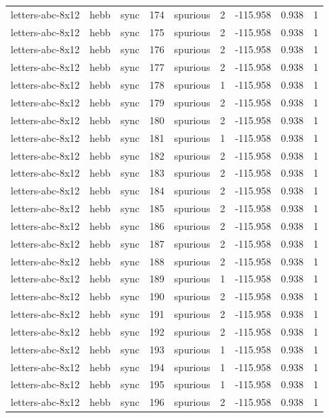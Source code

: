 \begin{tabular}{lllrlrrrr}
letters-abc-8x12 & hebb & sync & 174 & spurious & 2 & -115.958 & 0.938 & 1 \\
letters-abc-8x12 & hebb & sync & 175 & spurious & 2 & -115.958 & 0.938 & 1 \\
letters-abc-8x12 & hebb & sync & 176 & spurious & 2 & -115.958 & 0.938 & 1 \\
letters-abc-8x12 & hebb & sync & 177 & spurious & 2 & -115.958 & 0.938 & 1 \\
letters-abc-8x12 & hebb & sync & 178 & spurious & 1 & -115.958 & 0.938 & 1 \\
letters-abc-8x12 & hebb & sync & 179 & spurious & 2 & -115.958 & 0.938 & 1 \\
letters-abc-8x12 & hebb & sync & 180 & spurious & 2 & -115.958 & 0.938 & 1 \\
letters-abc-8x12 & hebb & sync & 181 & spurious & 1 & -115.958 & 0.938 & 1 \\
letters-abc-8x12 & hebb & sync & 182 & spurious & 2 & -115.958 & 0.938 & 1 \\
letters-abc-8x12 & hebb & sync & 183 & spurious & 2 & -115.958 & 0.938 & 1 \\
letters-abc-8x12 & hebb & sync & 184 & spurious & 2 & -115.958 & 0.938 & 1 \\
letters-abc-8x12 & hebb & sync & 185 & spurious & 2 & -115.958 & 0.938 & 1 \\
letters-abc-8x12 & hebb & sync & 186 & spurious & 2 & -115.958 & 0.938 & 1 \\
letters-abc-8x12 & hebb & sync & 187 & spurious & 2 & -115.958 & 0.938 & 1 \\
letters-abc-8x12 & hebb & sync & 188 & spurious & 2 & -115.958 & 0.938 & 1 \\
letters-abc-8x12 & hebb & sync & 189 & spurious & 1 & -115.958 & 0.938 & 1 \\
letters-abc-8x12 & hebb & sync & 190 & spurious & 2 & -115.958 & 0.938 & 1 \\
letters-abc-8x12 & hebb & sync & 191 & spurious & 2 & -115.958 & 0.938 & 1 \\
letters-abc-8x12 & hebb & sync & 192 & spurious & 2 & -115.958 & 0.938 & 1 \\
letters-abc-8x12 & hebb & sync & 193 & spurious & 1 & -115.958 & 0.938 & 1 \\
letters-abc-8x12 & hebb & sync & 194 & spurious & 1 & -115.958 & 0.938 & 1 \\
letters-abc-8x12 & hebb & sync & 195 & spurious & 1 & -115.958 & 0.938 & 1 \\
letters-abc-8x12 & hebb & sync & 196 & spurious & 2 & -115.958 & 0.938 & 1 \\

\end{tabular}
